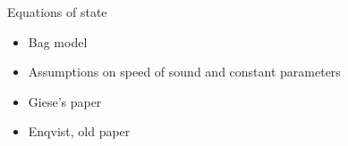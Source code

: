 
Equations of state
\begin{itemize}
    \item Bag model \cite[eq. 7.33]{hindmarsh_phase_2021}
    \item Assumptions on speed of sound and constant parameters
    \item Giese's paper \cite{giese_model-independent_2020}
    \item Enqvist, old paper \cite{enqvist_nucleation_1992}
\end{itemize}
